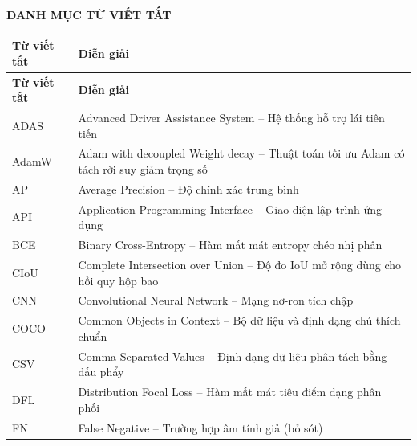 \newpage
\thispagestyle{plain}

\begin{center}
    {\bfseries\Large DANH MỤC TỪ VIẾT TẮT}
\end{center}

\vspace{0.8cm}

\renewcommand{\arraystretch}{1.25}

\begin{longtable}{>{\centering\arraybackslash}p{3.2cm} p{10.5cm}}
    \toprule
    \textbf{Từ viết tắt} & \textbf{Diễn giải} \\
    \midrule
    \endfirsthead

    \toprule
    \textbf{Từ viết tắt} & \textbf{Diễn giải} \\
    \midrule
    \endhead

    ADAS & Advanced Driver Assistance System -- Hệ thống hỗ trợ lái tiên tiến \\

    AdamW & Adam with decoupled Weight decay -- Thuật toán tối ưu Adam có tách rời suy giảm trọng số \\

    AP & Average Precision -- Độ chính xác trung bình \\

    API & Application Programming Interface -- Giao diện lập trình ứng dụng \\

    BCE & Binary Cross-Entropy -- Hàm mất mát entropy chéo nhị phân \\

    CIoU & Complete Intersection over Union -- Độ đo IoU mở rộng dùng cho hồi quy hộp bao \\

    CNN & Convolutional Neural Network -- Mạng nơ-ron tích chập \\

    COCO & Common Objects in Context -- Bộ dữ liệu và định dạng chú thích chuẩn \\

    CSV & Comma-Separated Values -- Định dạng dữ liệu phân tách bằng dấu phẩy \\

    DFL & Distribution Focal Loss -- Hàm mất mát tiêu điểm dạng phân phối \\

    FN & False Negative -- Trường hợp âm tính giả (bỏ sót) \\


\end{longtable}
